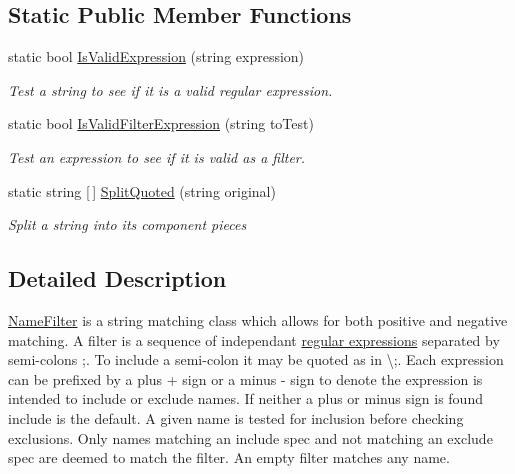 \subsection*{Static Public Member Functions}
\begin{DoxyCompactItemize}
\item 
static bool \hyperlink{class_i_c_sharp_code_1_1_sharp_zip_lib_1_1_core_1_1_name_filter_ae15c93155448a7efc04c5d02f0825efc}{Is\+Valid\+Expression} (string expression)
\begin{DoxyCompactList}\small\item\em Test a string to see if it is a valid regular expression. \end{DoxyCompactList}\item 
static bool \hyperlink{class_i_c_sharp_code_1_1_sharp_zip_lib_1_1_core_1_1_name_filter_a861e7d6873266c46847e7bb176afe70a}{Is\+Valid\+Filter\+Expression} (string to\+Test)
\begin{DoxyCompactList}\small\item\em Test an expression to see if it is valid as a filter. \end{DoxyCompactList}\item 
static string \mbox{[}$\,$\mbox{]} \hyperlink{class_i_c_sharp_code_1_1_sharp_zip_lib_1_1_core_1_1_name_filter_a8f148c5fbbd3a28f27b9602865333cb9}{Split\+Quoted} (string original)
\begin{DoxyCompactList}\small\item\em Split a string into its component pieces \end{DoxyCompactList}\end{DoxyCompactItemize}


\subsection{Detailed Description}
\hyperlink{class_i_c_sharp_code_1_1_sharp_zip_lib_1_1_core_1_1_name_filter}{Name\+Filter} is a string matching class which allows for both positive and negative matching. A filter is a sequence of independant \hyperlink{}{regular expressions} separated by semi-\/colons \textquotesingle{};\textquotesingle{}. To include a semi-\/colon it may be quoted as in \textbackslash{};. Each expression can be prefixed by a plus \textquotesingle{}+\textquotesingle{} sign or a minus \textquotesingle{}-\/\textquotesingle{} sign to denote the expression is intended to include or exclude names. If neither a plus or minus sign is found include is the default. A given name is tested for inclusion before checking exclusions. Only names matching an include spec and not matching an exclude spec are deemed to match the filter. An empty filter matches any name. 

